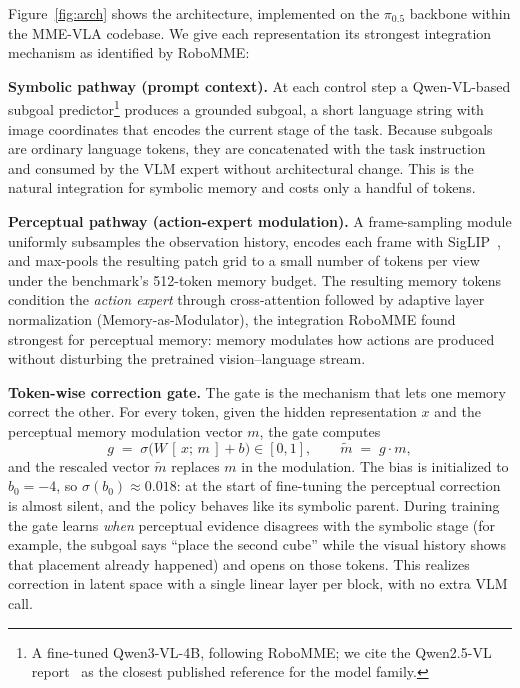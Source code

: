 \documentclass{article}
\begin{document}
Figure~\ref{fig:arch} shows the architecture, implemented on the $\pi_{0.5}$ backbone within the MME-VLA codebase. We give each representation its strongest integration mechanism as identified by RoboMME:

\textbf{Symbolic pathway (prompt context).} At each control step a Qwen-VL-based subgoal predictor\footnote{A fine-tuned Qwen3-VL-4B, following RoboMME; we cite the Qwen2.5-VL report~\cite{qwen25vl} as the closest published reference for the model family.} produces a grounded subgoal, a short language string with image coordinates that encodes the current stage of the task. Because subgoals are ordinary language tokens, they are concatenated with the task instruction and consumed by the VLM expert without architectural change. This is the natural integration for symbolic memory and costs only a handful of tokens.

\textbf{Perceptual pathway (action-expert modulation).} A frame-sampling module uniformly subsamples the observation history, encodes each frame with SigLIP~\cite{siglip}, and max-pools the resulting patch grid to a small number of tokens per view under the benchmark's 512-token memory budget. The resulting memory tokens condition the \emph{action expert} through cross-attention followed by adaptive layer normalization (Memory-as-Modulator), the integration RoboMME found strongest for perceptual memory: memory modulates how actions are produced without disturbing the pretrained vision--language stream.

\textbf{Token-wise correction gate.} The gate is the mechanism that lets one memory correct the other. For every token, given the hidden representation $x$ and the perceptual memory modulation vector $m$, the gate computes
\begin{equation}
  g \;=\; \sigma\!\big(W\,[\,x;\,m\,] + b\big) \in [0,1],
  \qquad
  \tilde{m} \;=\; g \cdot m,
\label{eq:gate}
\end{equation}
and the rescaled vector $\tilde{m}$ replaces $m$ in the modulation. The bias is initialized to $b_0=-4$, so $\sigma(b_0)\approx 0.018$: at the start of fine-tuning the perceptual correction is almost silent, and the policy behaves like its symbolic parent. During training the gate learns \emph{when} perceptual evidence disagrees with the symbolic stage (for example, the subgoal says ``place the second cube'' while the visual history shows that placement already happened) and opens on those tokens. This realizes correction in latent space with a single linear layer per block, with no extra VLM call.
\end{document}
